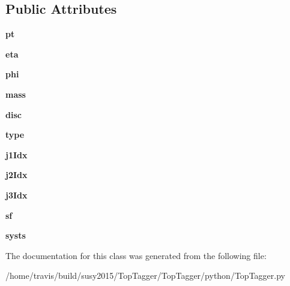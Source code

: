 \subsection*{Public Attributes}
\begin{DoxyCompactItemize}
\item 
\hypertarget{classTopTagger_1_1Top_a1eab0b54181fd0ea574e57b35ccc59e1}{{\bfseries pt}}\label{classTopTagger_1_1Top_a1eab0b54181fd0ea574e57b35ccc59e1}

\item 
\hypertarget{classTopTagger_1_1Top_a42895f21679a2a03ea4e320a9219b682}{{\bfseries eta}}\label{classTopTagger_1_1Top_a42895f21679a2a03ea4e320a9219b682}

\item 
\hypertarget{classTopTagger_1_1Top_af5ec16e9139fc919b6cca9f222915993}{{\bfseries phi}}\label{classTopTagger_1_1Top_af5ec16e9139fc919b6cca9f222915993}

\item 
\hypertarget{classTopTagger_1_1Top_a2a8d1553340a83f07989044d903813b2}{{\bfseries mass}}\label{classTopTagger_1_1Top_a2a8d1553340a83f07989044d903813b2}

\item 
\hypertarget{classTopTagger_1_1Top_a361f8b14fe698a10a815504bf554b5f9}{{\bfseries disc}}\label{classTopTagger_1_1Top_a361f8b14fe698a10a815504bf554b5f9}

\item 
\hypertarget{classTopTagger_1_1Top_a3da1fcb0f8ea21d672a105e30a03d496}{{\bfseries type}}\label{classTopTagger_1_1Top_a3da1fcb0f8ea21d672a105e30a03d496}

\item 
\hypertarget{classTopTagger_1_1Top_aebc3fb5ff67de0560cf769c4555de3b0}{{\bfseries j1\-Idx}}\label{classTopTagger_1_1Top_aebc3fb5ff67de0560cf769c4555de3b0}

\item 
\hypertarget{classTopTagger_1_1Top_a5543e5f414244684d33b9d0861013538}{{\bfseries j2\-Idx}}\label{classTopTagger_1_1Top_a5543e5f414244684d33b9d0861013538}

\item 
\hypertarget{classTopTagger_1_1Top_a71bca621aa593a25d15273386bda4cd0}{{\bfseries j3\-Idx}}\label{classTopTagger_1_1Top_a71bca621aa593a25d15273386bda4cd0}

\item 
\hypertarget{classTopTagger_1_1Top_a259645562ae12a67b9a3c5ea6a89264f}{{\bfseries sf}}\label{classTopTagger_1_1Top_a259645562ae12a67b9a3c5ea6a89264f}

\item 
\hypertarget{classTopTagger_1_1Top_a17325ceea5c3558fa47f96bd9a3eebb7}{{\bfseries systs}}\label{classTopTagger_1_1Top_a17325ceea5c3558fa47f96bd9a3eebb7}

\end{DoxyCompactItemize}


The documentation for this class was generated from the following file\-:\begin{DoxyCompactItemize}
\item 
/home/travis/build/susy2015/\-Top\-Tagger/\-Top\-Tagger/python/Top\-Tagger.\-py\end{DoxyCompactItemize}
